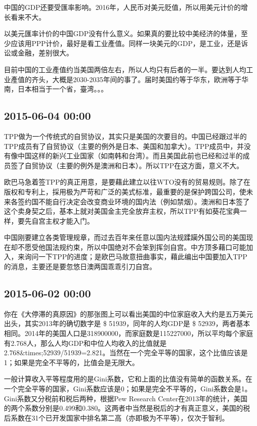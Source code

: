 \documentclass[twocolumn]{ctexart}
\begin{document}
中国的GDP还要受匯率影响。2016年，人民币对美元贬值，所以用美元计价的增长看来不大。

以美元匯率计价的中国GDP没有什么意义。如果真的要比较中美经济的体量，至少应该用PPP计价，最好是看工业產值。同样一块美元的GDP，是工业，还是诉讼或金融，差别很大。

目前中国的工业產值约当美国两倍左右，所以人均只有后者的一半。要达到人均工业產值的齐头，大概是2030-2035年间的事了。届时美国约等于华东，欧洲等于华南，日本相当于一个省，臺湾。。。\subsection*{2015-06-04 00:00}
TPP做为一个传统式的自贸协议，其实只是美国的次要目的。中国已经跟过半的TPP成员有了自贸协议（主要的例外是日本、美国和加拿大）。TPP成员中，并没有像中国这样的新兴工业国家（如南韩和台湾）。而且美国此前也已经和过半的成员签了自贸协议（主要的例外是澳洲和日本）。所以TPP在这方面，意义不大。

欧巴马急着签TPP的真正用意，是要藉此建立以往WTO没有的贸易规则。除了在版权和专利上，採用极为严苛和广泛的美式标准，最重要的是保护跨国公司，使未来各签约国不能自行决定会改变商业环境的国内法（例如禁烟）。澳洲和日本签了这个卖身契之后，基本上就对美国金主完全放弃主权，所以TPP有如葵花宝典一样，要先自宫主权才能入门。

中国刚要建立各类管理规章，而过去百年来任意以国内法规蹂躏外国公司的美国现在却不愿受他国法规约束，所以中国绝对不会笨到挥剑自宫。中方顶多藉口可能加入，来询问一下TPP的进度；是欧巴马故意扭曲事实，藉此编出中国要加入TPP的消息，主要还是要忽悠日澳两国乖乖引刀自宫。\subsection*{2015-06-02 00:00}
你在《大停滞的真原因》的那张图上可以看出美国的中位家庭收入大约是五万美元出头，其实2013年的确切数字是 \$ 51939，同年的人均GDP是 \$ 52939，两者基本相同。2014年的美国人口是318900000，而家庭数是115227000，所以平均每个家庭有2.768人，那么人均GDP和中位人均收入的比值就是2.768\&times;52939/51939=2.821。当然在一个完全平等的国家，这个比值应该是1；如果是完全不平等的，比值会是无限大。

一般计算收入平等程度用的是Gini系数，它和上面的比值没有简单的函数关系。在一个完全平等的国家，Gini系数应该是0；如果是完全不平等的，Gini系数会是1。Gini系数又分税前和税后两种，根据Pew Research Center在2013年的统计，美国的两个系数分别是0.499和0.380。这两者中当然是税后的才有真正意义，美国的税后系数在31个已开发国家中排名第二高（亦即极为不平等），仅次于智利。
\end{document}
